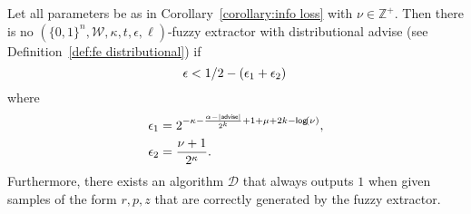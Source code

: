 \begin{lemma}
\label{lem:convert distinguisher}
Let all parameters be as in Corollary~\ref{corollary:info loss} with $\nu \in\mathbb{Z}^+$.  Then there is no $(\{0,1\}^n, \mathcal{W}, \kappa, t, \epsilon, \ell)$-fuzzy extractor with distributional advise (see Definition~\ref{def:fe distributional}) if
\[
\epsilon<1/2-\left(\epsilon_1+\epsilon_2\right)\\
\]
where 
\begin{align*}
\epsilon_1&= 2^{-\kappa-\frac{\alpha-|{\mathsf{advise}}|}{2^k}+1+\mu+2k-\mathsf{log}\!\left(\nu\right)},\\
\epsilon_2&=\frac{\nu+1}{2^{\kappa}}.
\end{align*}
Furthermore, there exists an algorithm $\mathcal{D}$ that always outputs $1$ when given samples of the form $r, p, z$ that are correctly generated by the fuzzy extractor.
\end{lemma}
